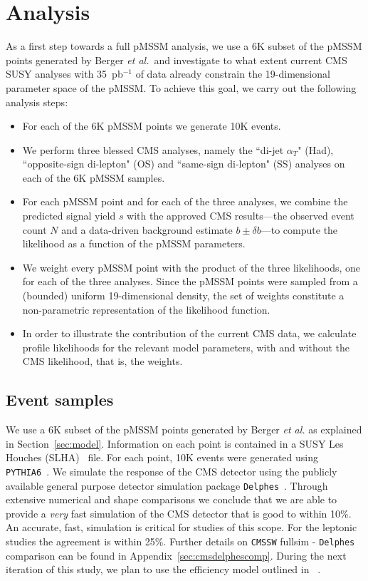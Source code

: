 \section{Analysis}
\label{sec:analysis}

As a first step towards a full pMSSM analysis, we use a 6K subset of the 
pMSSM points generated by Berger {\it et al.}\ and investigate to what
extent current CMS SUSY analyses with 35~pb$^{-1}$ of data already constrain the 
19-dimensional parameter space of the pMSSM.
To achieve this goal, we carry out the following analysis steps:
\begin{itemize}
\item For each of the 6K pMSSM points we generate 10K events.
\item We perform three blessed CMS analyses, namely the
 ``di-jet $\alpha_T$" (Had), ``opposite-sign di-lepton" (OS) and ``same-sign di-lepton" (SS) 
 analyses on each of the 6K pMSSM samples.
\item For each pMSSM point and for each of the three analyses, we combine the 
predicted signal yield $s$ with the approved CMS results---the
observed event count $N$ and 
a data-driven background estimate $b \pm \delta b$---to compute the likelihood as a function
of the pMSSM parameters. 
\item We weight every pMSSM point with the product of the three likelihoods, one  for each
of the three analyses. Since the pMSSM points were sampled from a (bounded) 
uniform  19-dimensional density, the set of weights constitute a non-parametric 
representation of the likelihood function. 
\item In order to illustrate the contribution of the current CMS data, we calculate profile likelihoods 
for the relevant model parameters, with and without the CMS likelihood, that is, the weights.  \end{itemize}

\subsection{Event samples}

We use a 6K subset of the pMSSM points generated by Berger \emph{et al.} 
as explained in Section~\ref{sec:model}.  Information on each point is contained in a SUSY Les Houches (SLHA)~\cite{Skands:2003cj} file.  For each point, 10K events were generated using {\tt PYTHIA6}~\cite{Sjostrand:2006za}.  We simulate the response of the CMS detector using
the publicly available general purpose detector simulation package {\tt Delphes}~\cite{Ovyn:2009tx}.  Through extensive numerical and shape comparisons we
conclude that we are able to provide a \emph{very} fast simulation of the CMS detector 
that is good to within 10\%. An accurate,  fast, simulation is critical for studies
of this scope. For the leptonic studies the agreement is within 25\%. Further details on {\tt CMSSW} fullsim - {\tt Delphes} comparison can be found in Appendix~\ref{sec:cmsdelphescomp}.
During the next iteration of this study, we plan to 
use the efficiency model outlined in ~\cite{sspaper}.

